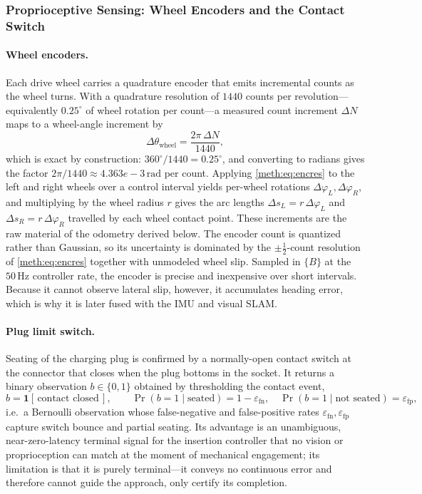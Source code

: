 \subsubsection{Proprioceptive Sensing: Wheel Encoders and the Contact Switch}

\paragraph{Wheel encoders.}
Each drive wheel carries a quadrature encoder that emits incremental counts as the wheel turns. With a quadrature resolution of $1440$ counts per revolution---equivalently \ensuremath{0.25^{\circ}} of wheel rotation per count---a measured count increment $\Delta N$ maps to a wheel-angle increment by
\begin{equation}
\Delta\theta_{\mathrm{wheel}} = \frac{2\pi\,\Delta N}{1440},
\label{meth:eq:encres}
\end{equation}
which is exact by construction: $360^{\circ}/1440=\ensuremath{0.25^{\circ}}$, and converting to radians gives the factor $2\pi/1440\approx\ensuremath{4.363e-3\,\mathrm{rad}}$ per count. Applying \eqref{meth:eq:encres} to the left and right wheels over a control interval yields per-wheel rotations $\Delta\varphi_{L},\Delta\varphi_{R}$, and multiplying by the wheel radius $r$ gives the arc lengths $\Delta s_{L}=r\,\Delta\varphi_{L}$ and $\Delta s_{R}=r\,\Delta\varphi_{R}$ travelled by each wheel contact point. These increments are the raw material of the odometry derived below. The encoder count is quantized rather than Gaussian, so its uncertainty is dominated by the $\pm\tfrac{1}{2}$-count resolution of \eqref{meth:eq:encres} together with unmodeled wheel slip. Sampled in $\{B\}$ at the \ensuremath{50\,\mathrm{Hz}} controller rate, the encoder is precise and inexpensive over short intervals. Because it cannot observe lateral slip, however, it accumulates heading error, which is why it is later fused with the IMU and visual SLAM.

\paragraph{Plug limit switch.}
Seating of the charging plug is confirmed by a normally-open contact switch at the connector that closes when the plug bottoms in the socket. It returns a binary observation $b\in\{0,1\}$ obtained by thresholding the contact event,
\begin{equation}
b = \mathbf{1}\!\left[\,\text{contact closed}\,\right],
\qquad
\Pr(b=1\mid \text{seated}) = 1-\varepsilon_{\mathrm{fn}},\quad
\Pr(b=1\mid \text{not seated}) = \varepsilon_{\mathrm{fp}},
\label{meth:eq:switch}
\end{equation}
i.e.\ a Bernoulli observation whose false-negative and false-positive rates $\varepsilon_{\mathrm{fn}},\varepsilon_{\mathrm{fp}}$ capture switch bounce and partial seating. Its advantage is an unambiguous, near-zero-latency terminal signal for the insertion controller that no vision or proprioception can match at the moment of mechanical engagement; its limitation is that it is purely terminal---it conveys no continuous error and therefore cannot guide the approach, only certify its completion.

